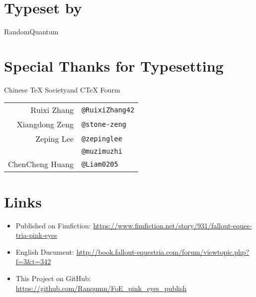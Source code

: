 \begin{english}
\section*{Typeset by}

\begin{center}
    RandomQuantum
\end{center}

\section*{Special Thanks for Typesetting}

\begin{table}[H]
    \centering
    
    \begin{center}
    Chinese \TeX{} Society\footnotemark and C\TeX{} Fourm\footnotemark
    \end{center}
  
    \begin{tabular}{rl}
        Ruixi Zhang & \texttt{@RuixiZhang42} \\
        Xiangdong Zeng & \texttt{@stone-zeng} \\
        Zeping Lee & \texttt{@zepinglee} \\
        & \texttt{@muzimuzhi} \\
        ChenCheng Huang & \texttt{@Liam0205} \\
    \end{tabular}
\end{table}

\addtocounter{footnote}{-2} %



\section*{Links}

\begin{itemize}
    \item Published on Fimfiction: \url{https://www.fimfiction.net/story/931/fallout-equestria-pink-eyes}
    \item English Ducument: \url{http://book.fallout-equestria.com/forum/viewtopic.php?f=3\&t=342}
    \item This Project on GitHub: \url{https://github.com/Ranqumn/FoE_pink_eyes_publish}
\end{itemize}


\end{english}

